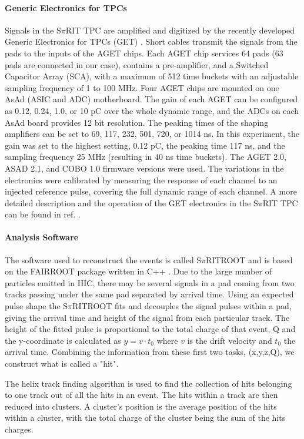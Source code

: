 \documentclass[review]{elsarticle}
\begin{document}
\paragraph{Generic Electronics for TPCs}
Signals in the S$\pi$RIT TPC are amplified and digitized by the recently developed Generic Electronics for TPCs (GET) \cite{get}.  Short cables transmit the signals from the pads to the inputs of the AGET chips. Each AGET chip services 64 pads (63 pads are connected in our case), contains a pre-amplifier, and a Switched Capacitor Array (SCA), with a maximum of 512 time buckets with an adjustable sampling frequency of 1 to 100 MHz. Four AGET chips are mounted on one AsAd (ASIC and ADC) motherboard. The gain of each AGET can be configured as 0.12, 0.24, 1.0, or 10 pC over the whole dynamic range, and the ADCs on each AsAd board provides 12 bit resolution. The peaking times of the shaping amplifiers can be set to 69, 117, 232, 501, 720, or 1014 ns. In this experiment, the gain was set to the highest setting, 0.12 pC, the peaking time 117 ns, and the sampling frequency 25 MHz (resulting in 40 ns time buckets). The AGET 2.0, ASAD 2.1, and COBO 1.0 firmware versions were used. The variations in the electronics were calibrated by measuring the response of each channel to an injected reference pulse, covering the full dynamic range of each channel. A more detailed description and the operation of the GET electronics in the S$\pi$RIT TPC can be found in ref. \cite{aki}.

\paragraph{Analysis Software}
The software used to reconstruct the events is called S$\pi$RITROOT and is based on the FAIRROOT package written in C++ \cite{fairroot}. Due to the large number of particles emitted in HIC, there may be several signals in a pad coming from two tracks passing under the same pad separated  by arrival time. Using an expected pulse shape the S$\pi$RITROOT fits and decouples the signal pulses within a pad, giving the arrival time and height of the signal from each particular track. The height of the fitted pulse is proportional to the total charge of that event, Q and the y-coordinate is calculated as $y = v\cdot t_0$ where $v$ is the drift velocity and $t_0$ the arrival time. Combining the information from these first two tasks, (x,y,z,Q), we construct what is called a "hit". 

 The helix track finding algorithm is used to find the collection of hits belonging to one track out of all the hits in an event. The hits within a track are then reduced into clusters. A cluster's position is the average position of the hits within a cluster, with the total charge of the cluster being the sum of the hits charges. 
 
\end{document}
